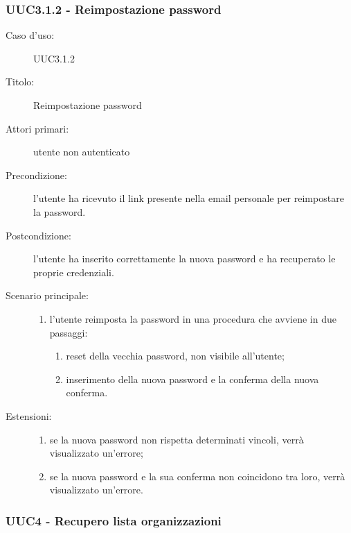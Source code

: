 \documentclass[casi-duso]{subfiles}
\begin{document}
\subsubsection{UUC3.1.2 - Reimpostazione password}%
\label{subsub:UUC3.1.2utente}
\begin{description}
  \item[Caso d’uso:] UUC3.1.2
  \item[Titolo:] Reimpostazione password
  \item[Attori primari:] utente non autenticato
  \item[Precondizione:] l'utente ha ricevuto il link presente nella email personale per reimpostare la password.
  \item[Postcondizione:] l'utente ha inserito correttamente la nuova password e ha recuperato le proprie credenziali.
  \item[Scenario principale:]
        \begin{enumerate}
          \item l'utente reimposta la password in una procedura che avviene in due passaggi:
                \begin{enumerate}
                  \item reset della vecchia password, non visibile all'utente;
                  \item inserimento della nuova password e la conferma della nuova conferma.
                \end{enumerate}
        \end{enumerate}
  \item[Estensioni:]
        \begin{enumerate}
          \item se la nuova password non rispetta determinati vincoli, verrà visualizzato un'errore;
          \item se la nuova password e la sua conferma non coincidono tra loro, verrà visualizzato un'errore.
        \end{enumerate}
\end{description}

\subsubsection{UUC4 - Recupero lista organizzazioni}%
\label{subsub:UUC4utente}
\end{document}
